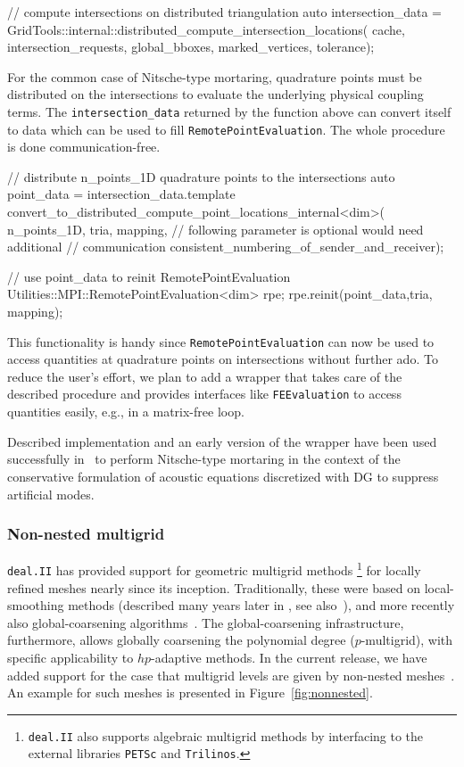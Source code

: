\documentclass{ansarticle-preprint}
\newcommand{\specialword}[1]{\texttt{#1}}
\newcommand{\dealii}{{\specialword{deal.II}}\xspace}
\begin{document}
\begin{c++}
// compute intersections on distributed triangulation  
auto intersection_data =
       GridTools::internal::distributed_compute_intersection_locations(
         cache, intersection_requests, global_bboxes, marked_vertices,
         tolerance);
\end{c++}

For the common case of Nitsche-type mortaring, quadrature points must be distributed on the intersections to evaluate the underlying physical coupling terms.
The \texttt{intersection\_data} returned by the function above can convert itself to data which can be used to fill \texttt{RemotePointEvaluation}.
The whole procedure is done communication-free.

\begin{c++}
// distribute n_points_1D quadrature points to the intersections
auto point_data = intersection_data.template 
       convert_to_distributed_compute_point_locations_internal<dim>(
         n_points_1D, tria, mapping,
         // following parameter is optional would need additional
         // communication 
         consistent_numbering_of_sender_and_receiver);

// use point_data to reinit RemotePointEvaluation
Utilities::MPI::RemotePointEvaluation<dim> rpe;
rpe.reinit(point_data,tria, mapping);
\end{c++}

This functionality is handy since \texttt{RemotePointEvaluation} can now be used to access quantities at quadrature points on intersections without further ado.
To reduce the user's effort, we plan to add a wrapper that takes care of the described procedure and provides interfaces like \texttt{FEEvaluation} to access quantities easily, e.g., in a matrix-free loop.

Described implementation and an early version of the wrapper have been used successfully in~\cite{heinz2023high} to perform Nitsche-type mortaring in the context of the conservative formulation of acoustic equations discretized with DG to suppress artificial modes.
\subsubsection{Non-nested multigrid}

\dealii has provided support for geometric multigrid methods%
\footnote{\dealii{} also supports algebraic multigrid methods
by interfacing to the external libraries \texttt{PETSc}
and \texttt{Trilinos}.}
for locally refined meshes nearly since its inception.
Traditionally, these were based on local-smoothing
methods (described many years later in \cite{Kanschat2004,JanssenKanschat2011}, see
also~\cite{ClevengerHeisterKanschatKronbichler2019}), and more
recently also global-coarsening algorithms~\cite{munch2022gc}. The global-coarsening
infrastructure, furthermore, allows globally coarsening the polynomial degree ($p$-multigrid),
with specific applicability to $hp$-adaptive methods.
In the current release, we have added support for the case
that multigrid levels are given by non-nested meshes~\cite{adams2002evaluation, bittencourt2001nonnested, bramble1991analysis}. An example for such meshes is
presented in Figure~\ref{fig:nonnested}.
\end{document}
